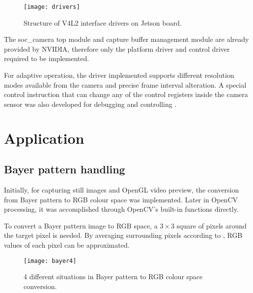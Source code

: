 \begin{figure}[H]
  \centering
  \texttt{[image: drivers]}
  \caption{Structure of V4L2 interface drivers on Jetson board.}
  \label{imp:drivers}
\end{figure}

The soc\_camera top module and capture buffer management module are already provided by NVIDIA, therefore only the platform driver and control driver  required to be implemented.

For adaptive operation, the driver implemented supports different resolution modes available from the camera and precise frame interval alteration. A special control instruction that can change any of the control registers inside the camera sensor was also developed for debugging and controlling .

\section{Application}


\subsection{Bayer pattern handling}

Initially, for capturing still images and OpenGL video preview, the conversion from Bayer pattern to RGB colour space was implemented. Later in OpenCV processing, it was accomplished through OpenCV's built-in functions directly.

To convert a Bayer pattern image to RGB space, a $3 \times 3$ square of pixels around the target pixel is needed. By averaging surrounding pixels according to , RGB values of each pixel can be approximated.

\begin{figure}[H]
  \centering
  \texttt{[image: bayer4]}
  \caption{4 different situations in Bayer pattern to RGB colour space conversion.}
  \label{imp:bayer4}
\end{figure}

